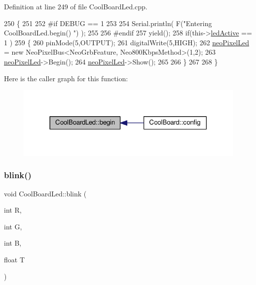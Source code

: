 Definition at line 249 of file Cool\+Board\+Led.\+cpp.


\begin{DoxyCode}
250 \{
251 
252 \textcolor{preprocessor}{#if DEBUG == 1}
253 
254     Serial.println( F(\textcolor{stringliteral}{"Entering CoolBoardLed.begin() "}) );
255 
256 \textcolor{preprocessor}{#endif}
257     yield();
258     \textcolor{keywordflow}{if}(this->\hyperlink{class_cool_board_led_aadd04d2ecf123247718d77f42fba7f08}{ledActive} == 1 )
259     \{
260         pinMode(5,OUTPUT);
261         digitalWrite(5,HIGH);
262         \hyperlink{class_cool_board_led_ac2c13fa462a010cd9242bf297c013923}{neoPixelLed} = \textcolor{keyword}{new} NeoPixelBus<NeoGrbFeature, Neo800KbpsMethod>(1,2); 
263         \hyperlink{class_cool_board_led_ac2c13fa462a010cd9242bf297c013923}{neoPixelLed}->Begin();
264         \hyperlink{class_cool_board_led_ac2c13fa462a010cd9242bf297c013923}{neoPixelLed}->Show();
265 
266     \}
267 
268 \} 
\end{DoxyCode}
Here is the caller graph for this function\+:\nopagebreak
\begin{figure}[H]
\begin{center}
\leavevmode
\includegraphics[width=318pt]{de/dc0/class_cool_board_led_ae3cbde8affcc6f011cbd698c8ef911f6_icgraph}
\end{center}
\end{figure}
\mbox{\label{class_cool_board_led_a96e1ea13003eee34c9dbcef340404426}} 
\subsubsection{\texorpdfstring{blink()}{blink()}}
{\footnotesize\ttfamily void Cool\+Board\+Led\+::blink (\begin{DoxyParamCaption}\item[{int}]{R,  }\item[{int}]{G,  }\item[{int}]{B,  }\item[{float}]{T }\end{DoxyParamCaption})}

